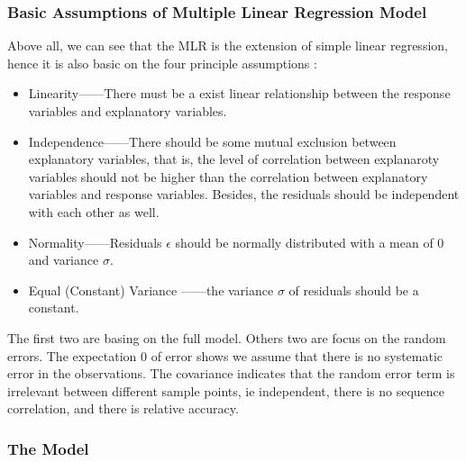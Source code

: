 \documentclass[a4paper]{article}
\begin{document}
\subsubsection{Basic Assumptions of Multiple Linear Regression Model}
Above all, we can see that the MLR is the extension of simple linear regression, hence it is also basic on the four principle assumptions :
\begin{itemize}
	\item Linearity——There must be a exist linear relationship between the response variables and explanatory variables.
	\item Independence——There should be some mutual exclusion between explanatory variables, that is, the level of correlation between explanaroty variables should not be higher than the correlation between explanatory variables and response variables. Besides, the residuals should be independent with each other as well.
	\item Normality——Residuals $\epsilon$ should be normally distributed with a mean of 0 and variance $\sigma$.
	\item Equal (Constant) Variance ——the variance $\sigma$ of residuals should be a constant.
\end{itemize}


\noindent
The first two are basing on the full model. Others two are focus on the random errors. The expectation 0 of error shows we assume that there is no systematic error in the observations. The covariance indicates that the random error term is irrelevant between different sample points, ie independent, there is no sequence correlation, and there is relative accuracy.











\subsubsection{The Model}
\end{document}
